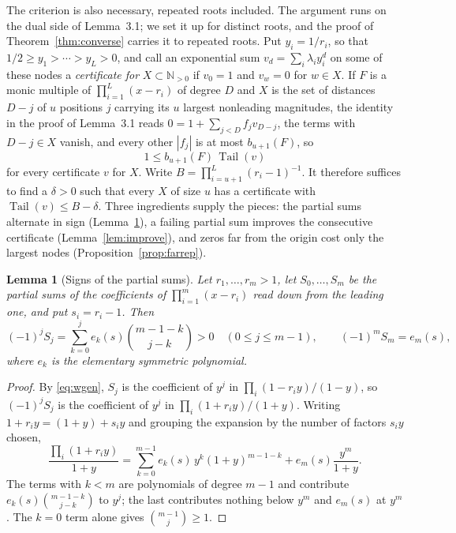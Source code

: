 \documentclass[11pt]{article}
\newtheorem{lemma}[theorem]{Lemma}
\theoremstyle{definition}
\theoremstyle{plain}
\newcommand{\N}{\mathbb N}
\DeclareMathOperator{\Tail}{Tail}
\begin{document}
The criterion is also necessary, repeated roots included.  The argument runs
on the dual side of Lemma~3.1; we set it up for distinct roots, and the proof
of Theorem~\ref{thm:converse} carries it to repeated roots.  Put $y_i=1/r_i$, so that
$1/2\ge y_1>\cdots>y_L>0$, and call an exponential sum
$v_d=\sum_i\lambda_iy_i^d$ on some of these nodes a \emph{certificate for}
$X\subset\N_{>0}$ if $v_0=1$ and $v_w=0$ for $w\in X$.  If $F$ is a monic
multiple of $\prod_{i=1}^L(x-r_i)$ of degree $D$ and $X$ is the set of
distances $D-j$ of $u$ positions $j$ carrying its $u$ largest nonleading
magnitudes, the identity in the proof of Lemma~3.1 reads
$0=1+\sum_{j<D}f_jv_{D-j}$, the terms with $D-j\in X$ vanish, and every other
$|f_j|$ is at most $b_{u+1}(F)$, so
\begin{equation}\label{eq:weak}
  1\le b_{u+1}(F)\,\Tail(v)
\end{equation}
for every certificate $v$ for $X$.  Write
$B=\prod_{i=u+1}^L(r_i-1)^{-1}$.  It therefore suffices to find a
$\delta>0$ such that every $X$ of size $u$ has a certificate with
$\Tail(v)\le B-\delta$.  Three ingredients supply the pieces: the partial
sums alternate in sign (Lemma~\ref{lem:signs}), a failing partial sum
improves the consecutive certificate (Lemma~\ref{lem:improve}), and zeros far
from the origin cost only the largest nodes
(Proposition~\ref{prop:farrep}).

\begin{lemma}[Signs of the partial sums]\label{lem:signs}
Let $r_1,\ldots,r_m>1$, let $S_0,\ldots,S_m$ be the partial sums of the
coefficients of $\prod_{i=1}^m(x-r_i)$ read down from the leading one, and put
$s_i=r_i-1$.  Then
\[
  (-1)^jS_j=\sum_{k=0}^{j}e_k(s)\binom{m-1-k}{j-k}>0\quad(0\le j\le m-1),
  \qquad (-1)^mS_m=e_m(s),
\]
where $e_k$ is the elementary symmetric polynomial.
\end{lemma}

\begin{proof}
By \eqref{eq:wgen}, $S_j$ is the coefficient of $y^j$ in
$\prod_i(1-r_iy)/(1-y)$, so $(-1)^jS_j$ is the coefficient of $y^j$ in
$\prod_i(1+r_iy)/(1+y)$.  Writing $1+r_iy=(1+y)+s_iy$ and grouping the
expansion by the number of factors $s_iy$ chosen,
\[
  \frac{\prod_i(1+r_iy)}{1+y}
  =\sum_{k=0}^{m-1}e_k(s)\,y^k(1+y)^{m-1-k}+e_m(s)\frac{y^m}{1+y}.
\]
The terms with $k<m$ are polynomials of degree $m-1$ and contribute
$e_k(s)\binom{m-1-k}{j-k}$ to $y^j$; the last contributes nothing below $y^m$
and $e_m(s)$ at $y^m$.  The $k=0$ term alone gives $\binom{m-1}{j}\ge1$.
\end{proof}
\end{document}
